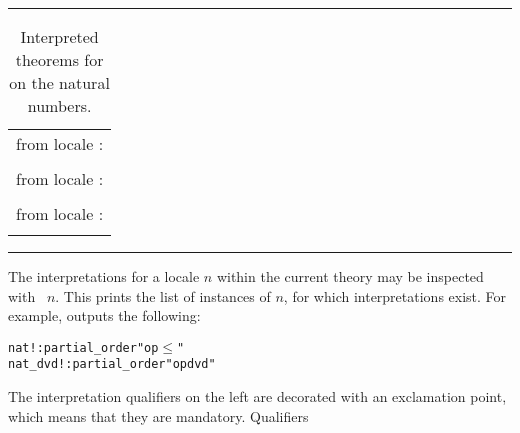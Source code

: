 \begin{isabellebody}
\begin{isamarkuptext}
\begin{table}
\hrule
\vspace{2ex}
\begin{center}
\begin{tabular}{l}
  \isa{nat{\isacharunderscore}dvd{\isachardot}less{\isacharunderscore}def} from locale \isa{partial{\isacharunderscore}order}: \\
  \quad \isa{{\isacharparenleft}{\isacharquery}x\ dvd\ {\isacharquery}y\ {\isasymand}\ {\isacharquery}x\ {\isasymnoteq}\ {\isacharquery}y{\isacharparenright}\ {\isacharequal}\ {\isacharparenleft}{\isacharquery}x\ dvd\ {\isacharquery}y\ {\isasymand}\ {\isacharquery}x\ {\isasymnoteq}\ {\isacharquery}y{\isacharparenright}} \\
  \isa{nat{\isacharunderscore}dvd{\isachardot}meet{\isacharunderscore}left} from locale \isa{lattice}: \\
  \quad \isa{gcd\ {\isacharquery}x\ {\isacharquery}y\ dvd\ {\isacharquery}x} \\
  \isa{nat{\isacharunderscore}dvd{\isachardot}join{\isacharunderscore}distr} from locale \isa{distrib{\isacharunderscore}lattice}: \\
  \quad \isa{lcm\ {\isacharquery}x\ {\isacharparenleft}gcd\ {\isacharquery}y\ {\isacharquery}z{\isacharparenright}\ {\isacharequal}\ gcd\ {\isacharparenleft}lcm\ {\isacharquery}x\ {\isacharquery}y{\isacharparenright}\ {\isacharparenleft}lcm\ {\isacharquery}x\ {\isacharquery}z{\isacharparenright}} \\
\end{tabular}
\end{center}
\hrule
\caption{Interpreted theorems for  on the natural numbers.}
\label{tab:nat-dvd-lattice}
\end{table}%
\end{isamarkuptext}%
\isamarkuptrue%
%
\isamarkuptrue%
%
\begin{isamarkuptext}%
The interpretations for a locale $n$ within the current
  theory may be inspected with ~$n$.  This
  prints the list of instances of $n$, for which interpretations exist.
  For example,  
  outputs the following:
\begin{alltt}
  nat! : partial_order "op \(\le\)"
  nat_dvd! : partial_order "op dvd"
\end{alltt}
  The interpretation qualifiers on the left are decorated with an
  exclamation point, which means that they are mandatory.  Qualifiers

\end{isamarkuptext}
\end{isabellebody}
